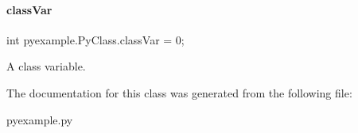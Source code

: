 \paragraph{\texorpdfstring{class\+Var}{classVar}}
{\footnotesize\ttfamily int pyexample.\+Py\+Class.\+class\+Var = 0;\hspace{0.3cm}{\ttfamily [static]}}



A class variable. 



The documentation for this class was generated from the following file\+:\begin{DoxyCompactItemize}
\item 
pyexample.\+py\end{DoxyCompactItemize}
